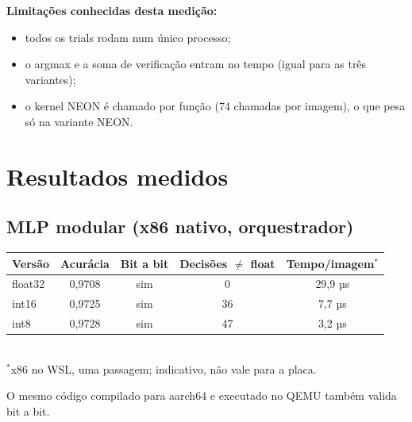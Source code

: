 \documentclass[10pt]{article}
\begin{document}
\textbf{Limitações conhecidas desta medição:}
\begin{itemize}
\item todos os trials rodam num único processo;
\item o argmax e a soma de verificação entram no tempo (igual para as três variantes);
\item o kernel NEON é chamado por função (74 chamadas por imagem), o que pesa só na variante NEON.
\end{itemize}

\section{Resultados medidos}

\subsection{MLP modular (x86 nativo, orquestrador)}
\begin{center}\footnotesize
\begin{tabular}{@{}lcccc@{}}
\toprule
Versão & Acurácia & Bit a bit & Decisões $\neq$ float & Tempo/imagem$^*$ \\
\midrule
float32 & 0,9708 & sim & 0 & 29,9 µs \\
int16 & 0,9725 & sim & 36 & 7,7 µs \\
int8 & 0,9728 & sim & 47 & 3,2 µs \\
\bottomrule
\end{tabular}\\[0.2em]
{\scriptsize $^*$x86 no WSL, uma passagem; indicativo, não vale para a placa.}
\end{center}
O mesmo código compilado para aarch64 e executado no QEMU também valida bit a bit.
\end{document}
